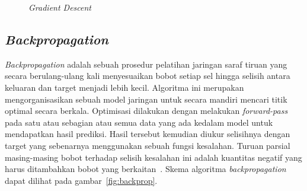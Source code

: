 \begin{figure}[htbp]
    \begin{center}
    \end{center}
    \vspace{-20pt}
    \captionsetup{labelfont=bf, textfont=bf}
    \caption{\textit{Gradient Descent}}
    \vspace{-10pt}
    \captionsetup{labelfont=md, textfont=md}
    \label{fig:gradientdescent}
\end{figure}

\subsection{\textit{Backpropagation}}

\textit{Backpropagation} adalah sebuah prosedur pelatihan jaringan saraf tiruan yang secara
berulang-ulang kali menyesuaikan bobot setiap sel hingga selisih antara keluaran dan target menjadi
lebih kecil. Algoritma ini merupakan mengorganisasikan sebuah model jaringan untuk secara mandiri
mencari titik optimal secara berkala. Optimisasi dilakukan dengan melakukan \textit{forward-pass}
pada satu atau sebagian atau semua data yang ada kedalam model untuk mendapatkan hasil prediksi.
Hasil tersebut kemudian diukur selisihnya dengan target yang sebenarnya menggunakan sebuah fungsi
kesalahan. Turuan parsial masing-masing bobot terhadap selisih kesalahan ini adalah kuantitas negatif
yang harus ditambahkan bobot yang berkaitan~\cite{Rumelhart:1986we}. Skema algoritma \textit{backpropagation}
dapat dilihat pada gambar~\ref{fig:backprop}.

